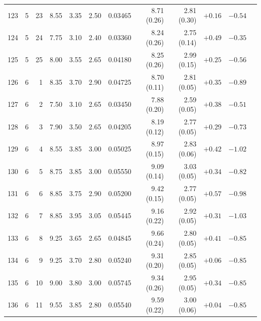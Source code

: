 \begin{longtable}{@{}rrrrrrrrrrrr@{}}
123 & 5 & 23 & \num{8.55} & \num{3.35} & \num{2.50} & \num{0.03465} & \num{8.71} (\num{0.26}) & \num{2.81} (\num{0.30}) & $+\num{0.16}$ & $-\num{0.54}$ &  \\
124 & 5 & 24 & \num{7.75} & \num{3.10} & \num{2.40} & \num{0.03360} & \num{8.24} (\num{0.26}) & \num{2.75} (\num{0.14}) & $+\num{0.49}$ & $-\num{0.35}$ &  \\
125 & 5 & 25 & \num{8.00} & \num{3.55} & \num{2.65} & \num{0.04180} & \num{8.25} (\num{0.26}) & \num{2.99} (\num{0.15}) & $+\num{0.25}$ & $-\num{0.56}$ &  \\
126 & 6 & 1 & \num{8.35} & \num{3.70} & \num{2.90} & \num{0.04725} & \num{8.70} (\num{0.11}) & \num{2.81} (\num{0.05}) & $+\num{0.35}$ & $-\num{0.89}$ &  \\
127 & 6 & 2 & \num{7.50} & \num{3.10} & \num{2.65} & \num{0.03450} & \num{7.88} (\num{0.20}) & \num{2.59} (\num{0.05}) & $+\num{0.38}$ & $-\num{0.51}$ &  \\
128 & 6 & 3 & \num{7.90} & \num{3.50} & \num{2.65} & \num{0.04205} & \num{8.19} (\num{0.12}) & \num{2.77} (\num{0.05}) & $+\num{0.29}$ & $-\num{0.73}$ &  \\
129 & 6 & 4 & \num{8.55} & \num{3.85} & \num{3.00} & \num{0.05025} & \num{8.97} (\num{0.15}) & \num{2.83} (\num{0.06}) & $+\num{0.42}$ & $-\num{1.02}$ &  \\
130 & 6 & 5 & \num{8.75} & \num{3.85} & \num{3.00} & \num{0.05550} & \num{9.09} (\num{0.14}) & \num{3.03} (\num{0.05}) & $+\num{0.34}$ & $-\num{0.82}$ &  \\
131 & 6 & 6 & \num{8.85} & \num{3.75} & \num{2.90} & \num{0.05200} & \num{9.42} (\num{0.15}) & \num{2.77} (\num{0.05}) & $+\num{0.57}$ & $-\num{0.98}$ &  \\
132 & 6 & 7 & \num{8.85} & \num{3.95} & \num{3.05} & \num{0.05445} & \num{9.16} (\num{0.22}) & \num{2.92} (\num{0.05}) & $+\num{0.31}$ & $-\num{1.03}$ &  \\
133 & 6 & 8 & \num{9.25} & \num{3.65} & \num{2.65} & \num{0.04845} & \num{9.66} (\num{0.24}) & \num{2.80} (\num{0.05}) & $+\num{0.41}$ & $-\num{0.85}$ &  \\
134 & 6 & 9 & \num{9.25} & \num{3.70} & \num{2.80} & \num{0.05240} & \num{9.31} (\num{0.20}) & \num{2.85} (\num{0.05}) & $+\num{0.06}$ & $-\num{0.85}$ &  \\
135 & 6 & 10 & \num{9.00} & \num{3.80} & \num{3.00} & \num{0.05745} & \num{9.34} (\num{0.26}) & \num{2.95} (\num{0.05}) & $+\num{0.34}$ & $-\num{0.85}$ &  \\
136 & 6 & 11 & \num{9.55} & \num{3.85} & \num{2.80} & \num{0.05540} & \num{9.59} (\num{0.22}) & \num{3.00} (\num{0.06}) & $+\num{0.04}$ & $-\num{0.85}$ &  \\

\end{longtable}
